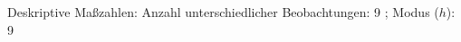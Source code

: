 				\label{tableValues:aocc08l_g1r}
				\vspace*{-\baselineskip}
                    \begin{noten}
                	    \note{} Deskriptive Maßzahlen:
                	    Anzahl unterschiedlicher Beobachtungen: 9%
                	    ; 
                	      Modus ($h$): 9
                     \end{noten}


